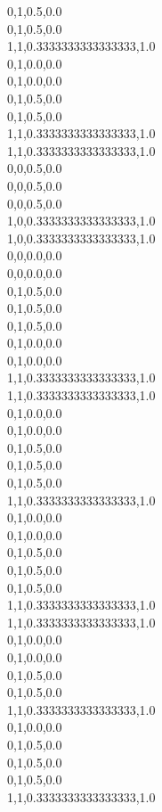 0,1,0.5,0.0\\
0,1,0.5,0.0\\
1,1,0.3333333333333333,1.0\\
0,1,0.0,0.0\\
0,1,0.0,0.0\\
0,1,0.5,0.0\\
0,1,0.5,0.0\\
1,1,0.3333333333333333,1.0\\
1,1,0.3333333333333333,1.0\\
0,0,0.5,0.0\\
0,0,0.5,0.0\\
0,0,0.5,0.0\\
1,0,0.3333333333333333,1.0\\
1,0,0.3333333333333333,1.0\\
0,0,0.0,0.0\\
0,0,0.0,0.0\\
0,1,0.5,0.0\\
0,1,0.5,0.0\\
0,1,0.5,0.0\\
0,1,0.0,0.0\\
0,1,0.0,0.0\\
1,1,0.3333333333333333,1.0\\
1,1,0.3333333333333333,1.0\\
0,1,0.0,0.0\\
0,1,0.0,0.0\\
0,1,0.5,0.0\\
0,1,0.5,0.0\\
0,1,0.5,0.0\\
1,1,0.3333333333333333,1.0\\
0,1,0.0,0.0\\
0,1,0.0,0.0\\
0,1,0.5,0.0\\
0,1,0.5,0.0\\
0,1,0.5,0.0\\
1,1,0.3333333333333333,1.0\\
1,1,0.3333333333333333,1.0\\
0,1,0.0,0.0\\
0,1,0.0,0.0\\
0,1,0.5,0.0\\
0,1,0.5,0.0\\
1,1,0.3333333333333333,1.0\\
0,1,0.0,0.0\\
0,1,0.5,0.0\\
0,1,0.5,0.0\\
0,1,0.5,0.0\\
1,1,0.3333333333333333,1.0\\
